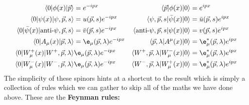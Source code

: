 \documentclass[relqm.tex]{subfiles}
\begin{document}
\begin{align}
    \langle0|\phi(x)|\vec{p}\rangle &= e^{-ipx} & \langle\vec{p}|\phi(x)|0\rangle &= e^{ipx} \\
    \langle0|\psi(x)|\psi,\vec{p},s\rangle &= u(\vec{p},s)e^{-ipx} & \langle\psi,\vec{p},s|\bar{\psi}(x)|0\rangle &= \bar{u}(\vec{p},s)e^{ipx} \\
    \langle0|\bar{\psi}(x)|\text{anti-}\psi,\vec{p},s\rangle &= \bar{v}(\vec{p},s)e^{-ipx} & \langle\text{anti-}\psi,\vec{p},s|\psi(x)|0\rangle &= v(\vec{p},s)e^{ipx} \\ 
    \langle0|A_\mu(x)|\vec{p},\lambda\rangle &= \e_\mu(\vec{p},\lambda)e^{-ipx} & \langle\vec{p},\lambda|A^\mu(x)|0\rangle &= \e_\mu^*(\vec{p},\lambda)e^{ipx} \\
    \langle0|W_\mu^+(x)|W^+,\vec{p},\lambda\rangle&\e_\mu(\vec{p},\lambda)e^{-ipx} & \langle W^+,\vec{p},\lambda|W_\mu^-(x)|0\rangle &= \e_\mu^*(\vec{p},\lambda)e^{ipx} \\
    \langle0|W_\mu^-(x)|W^-,\vec{p},\lambda\rangle&\e_\mu(\vec{p},\lambda)e^{-ipx} & \langle W^-,\vec{p},\lambda|W_\mu^+(x)|0\rangle &= \e_\mu^*(\vec{p},\lambda)e^{ipx} 
\end{align}
The simplicity of these spinors hints at a shortcut to the result which is simply a collection of rules which we can gather to skip all of the maths we have done above. 
These are the \textbf{Feynman rules:}
\end{document}
